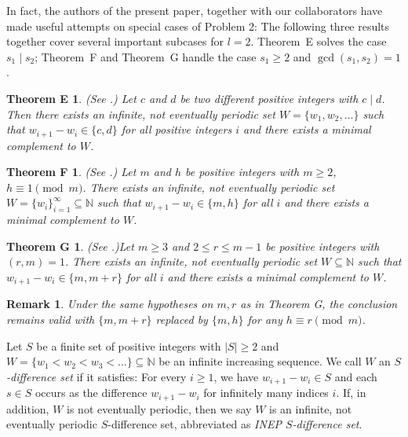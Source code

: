 \documentclass[12pt]{article}
\numberwithin{equation}{section}
\newtheorem{remark1}{Remark}%
\newtheorem*{theoremE}{Theorem E}
\newtheorem*{theoremF}{Theorem F}
\newtheorem*{theoremG}{Theorem G}
\begin{document}
In fact, the authors of the present paper, together with our collaborators have made useful attempts on special cases of Problem 2: The following three results together cover several important subcases for $l=2$. Theorem~E solves the case $s_1\mid s_2$; Theorem~F and Theorem~G handle the case $s_1\geqslant 2$ and $\gcd(s_1,s_2)=1$.

\begin{theoremE}(See \cite[Theorem 1.3]{chen2026}.) Let $c$ and $d$ be two different positive integers with $c\mid d$. Then there exists an infinite, not eventually periodic set $W=\{w_1,w_2,\ldots\}$ such that $w_{i+1}-w_{i}\in\{c,d\}$ for all positive integers $i$ and there exists a minimal complement to $W$.
\end{theoremE}

\begin{theoremF}(See \cite[Theorem 1.2]{Guo2025}.) Let $m$ and $h$ be positive integers with $m\geq2$, $h\equiv 1\pmod{m}$. There exists an infinite, not eventually periodic set $W=\{w_i\}_{i=1}^{\infty}\subseteq \mathbb{N}$ such that $w_{i+1}-w_i\in\{m,h\}$ for all $i$ and there exists a minimal complement to $W$.
\end{theoremF}

\begin{theoremG}(See \cite[Theorem 1.1]{He2026}.)\label{theoremG}Let $m\geq 3$ and $2\leq r\leq m-1$ be positive integers with $(r,m)=1$. There exists an infinite, not eventually periodic set $W\subseteq \mathbb{N}$ such that $w_{i+1}-w_i\in\{m,m+r\}$ for all $i$ and there exists a minimal complement to $W$.
\end{theoremG}

\begin{remark1}\label{rem1} Under the same hypotheses on $m,r$ as in Theorem G, the conclusion remains valid with $\{m,m+r\}$ replaced by $\{m,h\}$ for any $h\equiv r\pmod{m}$.
\end{remark1}

Let $S$ be a finite set of positive integers with $|S|\geqslant 2$ and $W = \{ w_1 < w_2 < w_3 < \dots \} \subseteq \mathbb{N}$
be an infinite increasing sequence. We call $W$ an \textit{$S$-difference set} if it satisfies: For every $i \geqslant 1$, we have $w_{i+1} - w_i \in S$ and
each $s \in S$ occurs as the difference $w_{i+1} - w_i$ for infinitely many indices $i$. If, in addition, $W$ is not eventually periodic, then we say $W$ is an infinite, not eventually periodic $S$-difference set, abbreviated as \textit{INEP $S$-difference set}.
\end{document}
